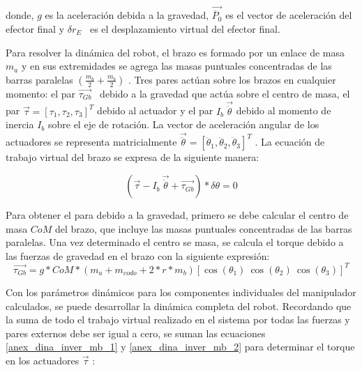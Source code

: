                 donde,  \( g \)  es la aceleración debida a la gravedad,  \( \overrightarrow{\ddot{P_{0}}} \)  es el vector de aceleración del efector final y  \(  \delta r_{E} \) \  es el desplazamiento virtual del efector final.
                
                Para resolver la dinámica del robot, el brazo es formado por un enlace de masa  \( m_{a} \)  y en sus extremidades se agrega las masas puntuales concentradas de las barras paralelas  \(  \left( \frac{m_{b}}{2}+\frac{m_{b}}{2} \right)  \)  . Tres pares actúan sobre los brazos en cualquier momento: el par  \( \overrightarrow{ \tau_{Gb}} \) \  debido a la gravedad que actúa sobre el centro de masa, el par  \( \overrightarrow{ \tau}= \left[  \tau_{1}, \tau_{2}, \tau_{3} \right] ^{T} \)  debido al actuador y el par  \( I_{b}~\overrightarrow{\ddot{ \theta }} \)  debido al momento de inercia  \( I_{b} \)  sobre el eje de rotación. La vector de aceleración angular de los actuadores se representa matricialmente  \( \overrightarrow{\ddot{ \theta }}= \left[ \ddot{ \theta }_{1},\ddot{ \theta }_{2},\ddot{ \theta }_{3} \right] ^{T} \) . La ecuación de trabajo virtual del brazo se expresa de la siguiente manera:
                
                 \[  \left( \overrightarrow{ \tau}-I_{b}~\overrightarrow{\ddot{ \theta }}+\overrightarrow{ \tau_{Gb}} \right) \ast \delta  \theta =0 \] 
                
                Para obtener el para debido a la gravedad, primero se debe calcular el centro de masa  \( CoM \)  del brazo, que incluye las masas puntuales concentradas de las barras paralelas. Una vez determinado el centro se masa, se calcula el torque debido a las fuerzas de gravedad en el brazo con la siguiente expresión:
                \begin{equation}
                 \overrightarrow{ \tau_{Gb}}=g\ast CoM\ast \left( m_{a}+m_{codo}+2\ast r\ast m_{b} \right)  \left[ \cos  \left(  \theta _{1} \right) ~\cos  \left(  \theta _{2} \right) ~\cos  \left(  \theta _{3} \right)  \right] ^{T} 
                \label{anex_dina_inver_mb_2}
                \end{equation}
                                \newpage

                
                Con los parámetros dinámicos para los componentes individuales del manipulador calculados, se puede desarrollar la dinámica completa del robot. Recordando que la suma de todo el trabajo virtual realizado en el sistema por todas las fuerzas y pares externos debe ser igual a cero, se suman las ecuaciones \ref{anex_dina_inver_mb_1} y \ref{anex_dina_inver_mb_2} para determinar el torque en los actuadores  \( \overrightarrow{ \tau} \)  :
                
